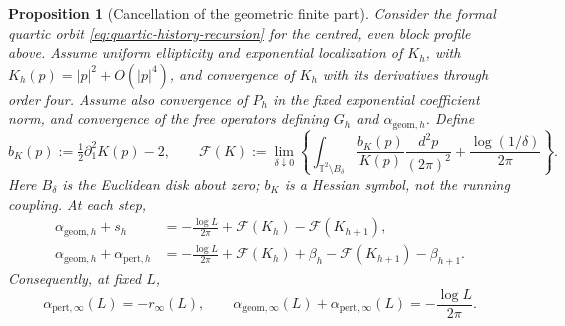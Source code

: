 \documentclass[11pt]{article}
\numberwithin{equation}{section}
\newtheorem{proposition}[theorem]{Proposition}
\theoremstyle{definition}
\theoremstyle{plain}
\begin{document}
\begin{proposition}[Cancellation of the geometric finite part]
\label{prop:limiting-one-loop-cancellation}
Consider the formal quartic orbit
\eqref{eq:quartic-history-recursion} for the centred, even block
profile above.  Assume uniform ellipticity and exponential
localization of $K_h$, with
$K_h(p)=|p|^2+O(|p|^4)$, and convergence of $K_h$ with its
derivatives through order four.  Assume also convergence of
$P_h$ in the fixed exponential coefficient norm, and convergence
of the free operators defining $G_h$ and
$\alpha_{\mathrm{geom},h}$.  Define
\begin{equation}
 b_K(p):=\tfrac12\partial_1^2K(p)-2,\qquad
 \mathcal F(K):=\lim_{\delta\downarrow0}\left\{
   \int_{\mathbb T^2\setminus B_\delta}
          \frac{b_K(p)}{K(p)}\frac{d^2p}{(2\pi)^2}
          +\frac{\log(1/\delta)}{2\pi}\right\}.
 \label{eq:kinetic-hessian-finite-part}
\end{equation}
Here $B_\delta$ is the Euclidean disk about zero; $b_K$ is a
Hessian symbol, not the running coupling.  At each step,
\begin{align}
 \alpha_{\mathrm{geom},h}+s_h
   &=-\frac{\log L}{2\pi}
        +\mathcal F(K_h)-\mathcal F(K_{h+1}),
 \label{eq:geom-source-telescope}\\
 \alpha_{\mathrm{geom},h}+\alpha_{\mathrm{pert},h}
   &=-\frac{\log L}{2\pi}
       +\mathcal F(K_h)+\beta_h
       -\mathcal F(K_{h+1})-\beta_{h+1}.
 \label{eq:full-one-loop-telescope}
\end{align}
Consequently, at fixed $L$,
\begin{equation}
 \alpha_{\mathrm{pert},\infty}(L)=-r_\infty(L),\qquad
 \alpha_{\mathrm{geom},\infty}(L)
       +\alpha_{\mathrm{pert},\infty}(L)
       =-\frac{\log L}{2\pi}.
 \label{eq:limiting-one-loop-cancellation}
\end{equation}
\end{proposition}
\end{document}
